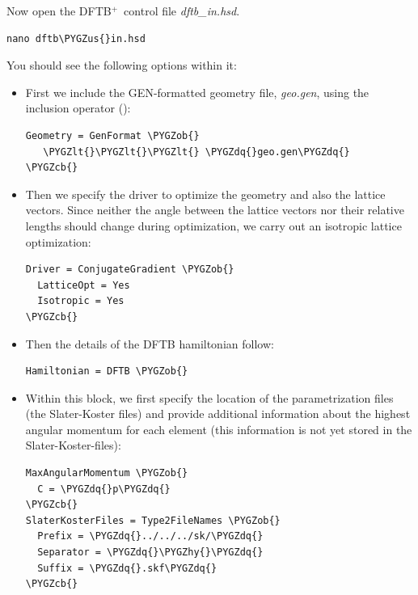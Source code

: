 \documentclass[a4paper,11pt,english]{sphinxmanual}
\newcommand{\dftbp}{\textsf{DFTB$^{\text{+}}$\ }} %
\def\PYGZus{\char`\_}
\def\PYGZob{\char`\{}
\def\PYGZcb{\char`\}}
\def\PYGZlt{\char`\<}
\def\PYGZhy{\char`\-}
\def\PYGZdq{\char`\"}
\begin{document}
{{Now open the \dftbp control file \emph{dftb\_in.hsd}.

\begin{Verbatim}[commandchars=\\\{\}]
nano dftb\PYGZus{}in.hsd
\end{Verbatim}

You should see the following options within it:
\begin{itemize}
\item {} 
First we include the GEN-formatted geometry file, \emph{geo.gen}, using
the inclusion operator (\code{\textless{}\textless{}\textless{}}):

\begin{Verbatim}[commandchars=\\\{\}]
Geometry = GenFormat \PYGZob{}
   \PYGZlt{}\PYGZlt{}\PYGZlt{} \PYGZdq{}geo.gen\PYGZdq{}
\PYGZcb{}
\end{Verbatim}

\item {} 
Then we specify the  driver to optimize the
geometry and also the lattice vectors. Since neither the angle
between the lattice vectors nor their relative lengths should change
during optimization, we carry out an isotropic lattice
optimization:

\begin{Verbatim}[commandchars=\\\{\}]
Driver = ConjugateGradient \PYGZob{}
  LatticeOpt = Yes
  Isotropic = Yes
\PYGZcb{}
\end{Verbatim}

\item {} 
Then the details of the DFTB hamiltonian follow:

\begin{Verbatim}[commandchars=\\\{\}]
Hamiltonian = DFTB \PYGZob{}
\end{Verbatim}

\item {} 
Within this block, we first specify the location of the
parametrization files (the Slater-Koster files) and provide
additional information about the highest angular momentum for each
element (this information is not yet stored in the
Slater-Koster-files):

\begin{Verbatim}[commandchars=\\\{\}]
MaxAngularMomentum \PYGZob{}
  C = \PYGZdq{}p\PYGZdq{}
\PYGZcb{}
SlaterKosterFiles = Type2FileNames \PYGZob{}
  Prefix = \PYGZdq{}../../../sk/\PYGZdq{}
  Separator = \PYGZdq{}\PYGZhy{}\PYGZdq{}
  Suffix = \PYGZdq{}.skf\PYGZdq{}
\PYGZcb{}
\end{Verbatim}


\end{itemize}}}
\end{document}
